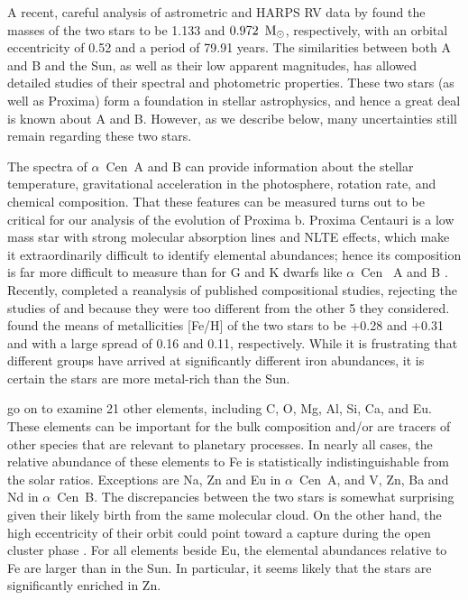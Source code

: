 \documentclass[preprint,12pt]{aastex}
\def\msun{{\rm\,M_\odot}}
\def\eg{{\it e.g.\ }}
\def\acen{{$\alpha$~Cen}}
\begin{document}
A recent, careful analysis of astrometric and HARPS RV data by
\cite{PourbaixBoffin16} found the masses of the two stars to be 1.133
and $0.972~\msun$, respectively, with an orbital eccentricity of 0.52
and a period of 79.91 years. The similarities between both A and B and
the Sun, as well as their low apparent magnitudes, has allowed
detailed studies of their spectral and photometric properties. These
two stars (as well as Proxima) form a foundation in stellar astrophysics,
and hence a great deal is known about A and B. However, as we describe
below, many uncertainties still remain regarding these two stars.

The spectra of \acen~A and B can provide information about the stellar
temperature, gravitational acceleration in the photosphere, rotation
rate, and chemical composition. That these features can be
measured turns out to be critical for our analysis of the evolution of
Proxima b. Proxima Centauri is a low mass star with strong molecular
absorption lines and NLTE effects, which make it extraordinarily
difficult to identify elemental abundances; hence its composition
is far more difficult to measure than for G and K dwarfs like \acen~ A
and B \citep{Johnson2009}.  Recently, \cite{HinkelKane13} completed a
reanalysis of published compositional studies, rejecting the studies
of \cite{Laird85} and \cite{NeuforgeMagain97} because they were too
different from the other 5 they considered.  \cite{HinkelKane13}
  found the means of metallicities [Fe/H] of the two stars to be
+0.28 and +0.31 and with a large spread of 0.16 and 0.11,
respectively. While it is frustrating that different groups have
arrived at significantly different iron abundances, it is certain the
stars are more metal-rich than the Sun.

\cite{HinkelKane13} go on to examine 21 other elements, including C,
O, Mg, Al, Si, Ca, and Eu. These elements can be important for the
bulk composition and/or are tracers of other species that are relevant
to planetary processes. In nearly all cases, the relative abundance of
these elements to Fe is statistically indistinguishable from the solar
ratios. Exceptions are Na, Zn and Eu in \acen~A, and V, Zn, Ba
and Nd in \acen~B. The discrepancies between the two stars is
somewhat surprising given their likely birth from the same molecular
cloud. On the other hand, the high eccentricity of their orbit could
point toward a capture during the open cluster phase \citep[\eg][]{Malmberg07}. For all
elements beside Eu, the elemental abundances relative to Fe are larger
than in the Sun. In particular, it seems likely that the stars are
significantly enriched in Zn.
\end{document}
